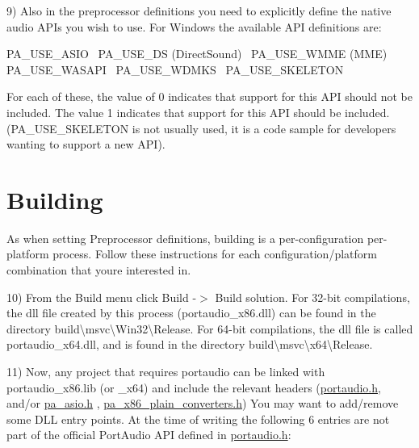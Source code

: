 9) Also in the preprocessor definitions you need to explicitly define the native audio A\+P\+Is you wish to use. For Windows the available A\+PI definitions are\+:

P\+A\+\_\+\+U\+S\+E\+\_\+\+A\+S\+IO~\newline
 P\+A\+\_\+\+U\+S\+E\+\_\+\+DS (Direct\+Sound)~\newline
 P\+A\+\_\+\+U\+S\+E\+\_\+\+W\+M\+ME (M\+ME)~\newline
 P\+A\+\_\+\+U\+S\+E\+\_\+\+W\+A\+S\+A\+PI~\newline
 P\+A\+\_\+\+U\+S\+E\+\_\+\+W\+D\+M\+KS~\newline
 P\+A\+\_\+\+U\+S\+E\+\_\+\+S\+K\+E\+L\+E\+T\+ON

For each of these, the value of 0 indicates that support for this A\+PI should not be included. The value 1 indicates that support for this A\+PI should be included. (P\+A\+\_\+\+U\+S\+E\+\_\+\+S\+K\+E\+L\+E\+T\+ON is not usually used, it is a code sample for developers wanting to support a new A\+PI).\hypertarget{compile_windows_comp_win3}{}\section{Building}\label{compile_windows_comp_win3}
As when setting Preprocessor definitions, building is a per-\/configuration per-\/platform process. Follow these instructions for each configuration/platform combination that you\textquotesingle{}re interested in.

10) From the Build menu click Build -\/$>$ Build solution. For 32-\/bit compilations, the dll file created by this process (portaudio\+\_\+x86.\+dll) can be found in the directory build\textbackslash{}msvc\textbackslash{}Win32\textbackslash{}Release. For 64-\/bit compilations, the dll file is called portaudio\+\_\+x64.\+dll, and is found in the directory build\textbackslash{}msvc\textbackslash{}x64\textbackslash{}Release.

11) Now, any project that requires portaudio can be linked with portaudio\+\_\+x86.\+lib (or \+\_\+x64) and include the relevant headers (\hyperlink{portaudio_8h}{portaudio.\+h}, and/or \hyperlink{pa__asio_8h}{pa\+\_\+asio.\+h} , \hyperlink{pa__x86__plain__converters_8h}{pa\+\_\+x86\+\_\+plain\+\_\+converters.\+h}) You may want to add/remove some D\+LL entry points. At the time of writing the following 6 entries are not part of the official Port\+Audio A\+PI defined in \hyperlink{portaudio_8h}{portaudio.\+h}\+:

